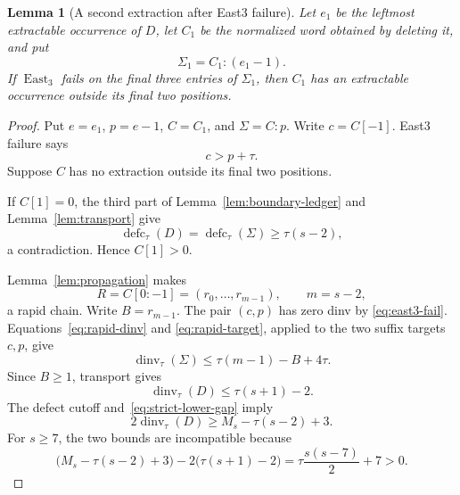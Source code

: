 \documentclass[11pt]{article}
\newtheorem{lemma}[theorem]{Lemma}
\theoremstyle{definition}
\theoremstyle{remark}
\newcommand{\dinv}{\operatorname{dinv}}
\newcommand{\defc}{\operatorname{defc}}
\newcommand{\East}{\operatorname{East}}
\begin{document}
\begin{lemma}[A second extraction after East3 failure]
\label{lem:up-second-position}
Let $e_1$ be the leftmost extractable occurrence of $D$, let $C_1$ be the
normalized word obtained by deleting it, and put
\[
  \Sigma_1=C_1:(e_1-1).
\]
If $\East_3$ fails on the final three entries of $\Sigma_1$, then $C_1$ has
an extractable occurrence outside its final two positions.
\end{lemma}

\begin{proof}
Put $e=e_1$, $p=e-1$, $C=C_1$, and $\Sigma=C:p$.  Write $c=C[-1]$.
East3 failure says
\begin{equation}
  c>p+\tau.
  \label{eq:east3-fail}
\end{equation}
Suppose $C$ has no extraction outside its final two positions.

If $C[1]=0$, the third part of Lemma~\ref{lem:boundary-ledger} and
Lemma~\ref{lem:transport} give
\[
  \defc_\tau(D)=\defc_\tau(\Sigma)\ge\tau(s-2),
\]
a contradiction.  Hence $C[1]>0$.

Lemma~\ref{lem:propagation} makes
\[
  R=C[0:-1]=(r_0,\ldots,r_{m-1}),
  \qquad m=s-2,
\]
a rapid chain.  Write $B=r_{m-1}$.  The pair $(c,p)$ has zero dinv by
\eqref{eq:east3-fail}.  Equations~\eqref{eq:rapid-dinv} and
\eqref{eq:rapid-target}, applied to the two suffix targets $c,p$, give
\[
  \dinv_\tau(\Sigma)
  \le\tau(m-1)-B+4\tau.
\]
Since $B\ge1$, transport gives
\begin{equation}
  \dinv_\tau(D)\le\tau(s+1)-2.
  \label{eq:up3-upper}
\end{equation}
The defect cutoff and~\eqref{eq:strict-lower-gap} imply
\begin{equation}
  2\dinv_\tau(D)
  \ge M_s-\tau(s-2)+3.
  \label{eq:up3-lower}
\end{equation}
For $s\ge7$, the two bounds are incompatible because
\[
 \bigl(M_s-\tau(s-2)+3\bigr)
 -2\bigl(\tau(s+1)-2\bigr)
 =\tau\frac{s(s-7)}2+7>0.
\]


\end{proof}
\end{document}
